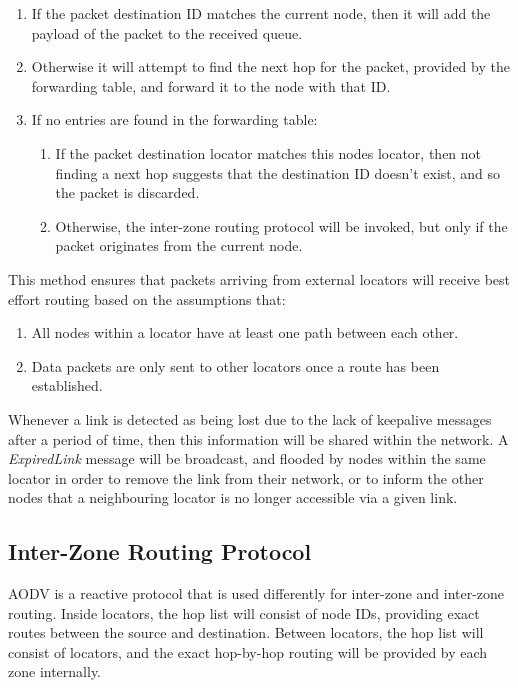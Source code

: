 \documentclass[12pt]{article}
\begin{document}
\begin{enumerate}
	\item If the packet destination ID matches the current node, then it will add the payload of the packet to the received queue. 
	\item Otherwise it will attempt to find the next hop for the packet, provided by the forwarding table, and forward it to the node with that ID. 
	\item If no entries are found in the forwarding table:
	\begin{enumerate}
		\item If the packet destination locator matches this nodes locator, then not finding a next hop suggests that the destination ID doesn't exist, and so the packet is discarded. 
		\item Otherwise, the inter-zone routing protocol will be invoked, but only if the packet originates from the current node. 
	\end{enumerate}
\end{enumerate}

This method ensures that packets arriving from external locators will receive best effort routing based on the assumptions that:

\begin{enumerate}
	\item All nodes within a locator have at least one path between each other. 
	\item Data packets are only sent to other locators once a route has been established.
\end{enumerate}

Whenever a link is detected as being lost due to the lack of keepalive messages after a period of time, then this information will be shared within the network. A \emph{ExpiredLink} message will be broadcast, and flooded by nodes within the same locator in order to remove the link from their network, or to inform the other nodes that a neighbouring locator is no longer accessible via a given link.

\subsection{Inter-Zone Routing Protocol}

AODV is a reactive protocol that is used differently for inter-zone and inter-zone routing. Inside locators, the hop list will consist of node IDs, providing exact routes between the source and destination. Between locators, the hop list will consist of locators, and the exact hop-by-hop routing will be provided by each zone internally.
\end{document}
